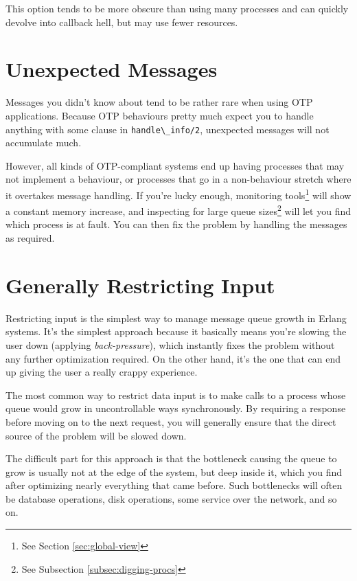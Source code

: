 \documentclass[11pt, oneside]{book}   	%
\newcommand{\function}[1]{\Verb`#1`}
\begin{document}
This option tends to be more obscure than using many processes and can quickly devolve into callback hell, but may use fewer resources.

\section{Unexpected Messages}

Messages you didn't know about tend to be rather rare when using OTP applications. Because OTP behaviours pretty much expect you to handle anything with some clause in \function{handle\_info/2}, unexpected messages will not accumulate much.

However, all kinds of OTP-compliant systems end up having processes that may not implement a behaviour, or processes that go in a non-behaviour stretch where it overtakes message handling. If you're lucky enough, monitoring tools\footnote{See Section \ref{sec:global-view}} will show a constant memory increase, and inspecting for large queue sizes\footnote{See Subsection \ref{subsec:digging-procs}} will let you find which process is at fault. You can then fix the problem by handling the messages as required.

\section{Generally Restricting Input}

Restricting input is the simplest way to manage message queue growth in Erlang systems. It's the simplest approach because it basically means you're slowing the user down (applying \emph{back-pressure}), which instantly fixes the problem without any further optimization required. On the other hand, it's the one that can end up giving the user a really crappy experience.

The most common way to restrict data input is to make calls to a process whose queue would grow in uncontrollable ways synchronously. By requiring a response before moving on to the next request, you will generally ensure that the direct source of the problem will be slowed down.

The difficult part for this approach is that the bottleneck causing the queue to grow is usually not at the edge of the system, but deep inside it, which you find after optimizing nearly everything that came before. Such bottlenecks will often be database operations, disk operations, some service over the network, and so on. 
\end{document}
